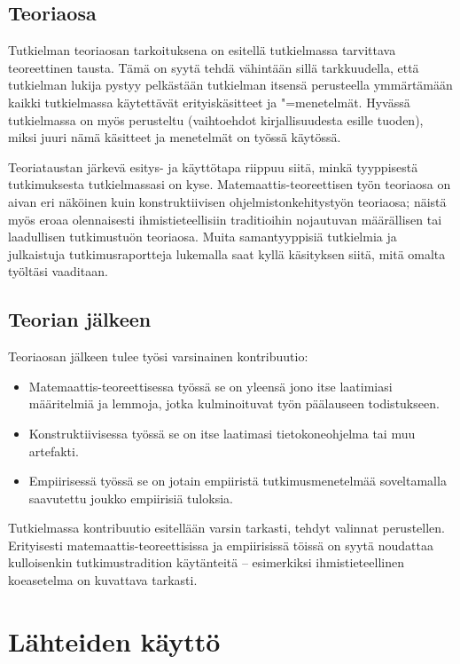 \documentclass[utf8]{gradu3-tjt}
\begin{document}
\section{Teoriaosa}

Tutkielman teoriaosan tarkoituksena on esitellä tutkielmassa
tarvittava teoreettinen tausta.  Tämä on syytä tehdä vähintään sillä
tarkkuudella, että tutkielman lukija pystyy pelkästään tutkielman
itsensä perusteella ymmärtämään kaikki tutkielmassa käytettävät
erityiskäsitteet ja "=menetelmät.  Hyvässä tutkielmassa on myös
perusteltu (vaihtoehdot kirjallisuudesta esille tuoden), miksi juuri
nämä käsitteet ja menetelmät on työssä käytössä.

Teoriataustan järkevä esitys- ja käyttötapa riippuu siitä, minkä
tyyppisestä tutkimuksesta tutkielmassasi on kyse.
Matemaattis-teoreettisen työn teoriaosa on aivan eri näköinen kuin
konstruktiivisen ohjelmistonkehitystyön teoriaosa; näistä myös eroaa
olennaisesti ihmistieteellisiin traditioihin nojautuvan määrällisen
tai laadullisen tutkimustuön teoriaosa.  Muita samantyyppisiä
tutkielmia ja julkaistuja tutkimusraportteja lukemalla saat kyllä
käsityksen siitä, mitä omalta työltäsi vaaditaan.

\section{Teorian jälkeen}

Teoriaosan jälkeen tulee työsi varsinainen kontribuutio:
\begin{itemize}
\item Matemaattis-teoreettisessa työssä se on yleensä jono itse
  laatimiasi määritelmiä ja lemmoja, jotka kulminoituvat työn
  päälauseen todistukseen.
\item Konstruktiivisessa työssä se on itse laatimasi tietokoneohjelma
  tai muu artefakti.
\item Empiirisessä työssä se on jotain empiiristä tutkimusmenetelmää
  soveltamalla saavutettu joukko empiirisiä tuloksia.
\end{itemize}

Tutkielmassa kontribuutio esitellään varsin tarkasti, tehdyt valinnat
perustellen.  Erityisesti matemaattis-teoreettisissa ja empiirisissä
töissä on syytä noudattaa kulloisenkin tutkimustradition käytänteitä
-- esimerkiksi ihmistieteellinen koeasetelma on kuvattava tarkasti.

\chapter{Lähteiden käyttö}
\end{document}
